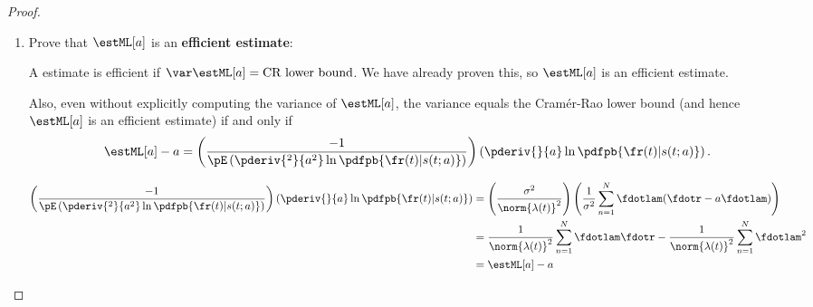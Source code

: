 {\begin{proof}
\begin{enumerate}
\item Prove that $\estML[a]$ is an {\bf efficient estimate}:

A estimate is efficient if
$\var\estML[a]=\mbox{CR lower bound}$.
We have already proven this, so $\estML[a]$ is an efficient estimate.

Also, even without explicitly computing the variance of $\estML[a]$,
the variance equals the Cram\'er-Rao lower bound
(and hence $\estML[a]$ is an efficient estimate)
if and only if
\[ \estML[a] -  a =
   \left( \frac{-1}{\pE\left(
              \pderiv{^2}{ a^2} \ln \pdfpb{\fr(t)|s(t; a)}
           \right)} \right)
   \left(\pderiv{}{ a} \ln \pdfpb{\fr(t)|s(t; a)} \right).
\]

\begin{align*}
   \left( \frac{-1}{\pE\left(
              \pderiv{^2}{ a^2} \ln \pdfpb{\fr(t)|s(t; a)}
           \right)} \right)
   \left(\pderiv{}{ a} \ln \pdfpb{\fr(t)|s(t; a)} \right)
     &= \left(\frac{\sigma^2}{\norm{\lambda(t)}^2}\right)
         \left(
           \frac{1}{\sigma^2} \sum_{n=1}^N \fdotlam( \fdotr - a \fdotlam)
         \right)
   \\&= \frac{1}{\norm{\lambda(t)}^2} \sum_{n=1}^N \fdotlam \fdotr -
         \frac{1}{\norm{\lambda(t)}^2} \sum_{n=1}^N \fdotlam^2
   \\&= \estML[a] - a
\end{align*}


\end{enumerate}
\end{proof}


}
